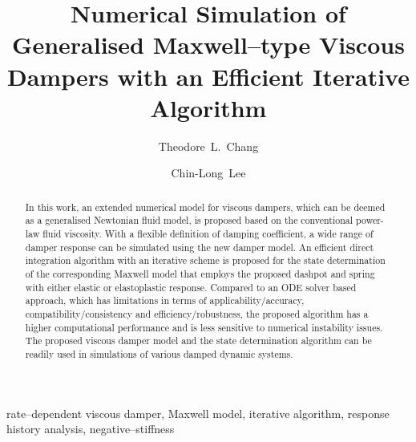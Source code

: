 \documentclass[3p,sort&compress,11pt,fleqn,review]{elsarticle}
\begin{document}
\begin{abstract}
In this work, an extended numerical model for viscous dampers, which can be deemed as a generalised Newtonian fluid model, is proposed based on the conventional power-law fluid viscosity. With a flexible definition of damping coefficient, a wide range of damper response can be simulated using the new damper model. An efficient direct integration algorithm with an iterative scheme is proposed for the state determination of the corresponding Maxwell model that employs the proposed dashpot and spring with either elastic or elastoplastic response. Compared to an ODE solver based approach, which has limitations in terms of applicability/accuracy, compatibility/consistency and efficiency/robustness, the proposed algorithm has a higher computational performance and is less sensitive to numerical instability issues. The proposed viscous damper model and the state determination algorithm can be readily used in simulations of various damped dynamic systems.
\end{abstract}
\begin{keyword}
rate--dependent viscous damper\sep
Maxwell model\sep
iterative algorithm\sep
response history analysis\sep
negative--stiffness
\end{keyword}
\begin{frontmatter}
\title{Numerical Simulation of Generalised {M}axwell--type Viscous Dampers with an Efficient Iterative Algorithm}
\author[add1]{Theodore~L.~Chang}
\author[add1]{Chin-Long~Lee}
\address[add1]{Department of Civil and Natural Resources Engineering, University of Canterbury, Christchurch, New Zealand, 8041.}
\end{frontmatter}


\end{document}
